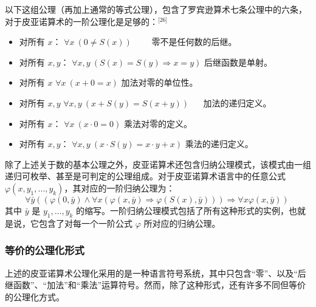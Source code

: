 以下这组公理（再加上通常的等式公理），包含了罗宾逊算术七条公理中的六条，对于皮亚诺算术的一阶公理化是足够的：\(^\text{[26]}\)
\begin{itemize}
\item 对所有 $x$：
      $\forall x\ (0 \ne S(x))$
     零不是任何数的后继。
\item 对所有 $x, y$：
      $\forall x, y\ (S(x) = S(y) \Rightarrow x = y)$
      后继函数是单射。
\item 对所有 $x$
      $\forall x\ (x + 0 = x)$
      加法对零的单位性。
\item 对所有 $x, y$
      $\forall x, y\ (x + S(y) = S(x + y))$
      加法的递归定义。
\item 对所有 $x$：
      $\forall x\ (x \cdot 0 = 0)$
      乘法对零的定义。
\item 对所有 $x, y$：
      $\forall x, y\ (x \cdot S(y) = x \cdot y + x)$
      乘法的递归定义。
\end{itemize}
除了上述关于数的基本公理之外，皮亚诺算术还包含归纳公理模式，该模式由一组递归可枚举、甚至是可判定的公理组成。对于皮亚诺算术语言中的任意公式 $\varphi(x, y_1, \ldots, y_k)$，其对应的一阶归纳公理为：
$$
\forall \bar{y} \left( \left( \varphi(0, \bar{y}) \land \forall x\left( \varphi(x, \bar{y}) \Rightarrow \varphi(S(x), \bar{y}) \right) \right) \Rightarrow \forall x \varphi(x, \bar{y}) \right)~
$$
其中 $\bar{y}$ 是 $y_1, \ldots, y_k$ 的缩写。一阶归纳公理模式包括了所有这种形式的实例，也就是说，它包含了对每一个一阶公式 $\varphi$ 所对应的归纳公理。
\subsubsection{等价的公理化形式}
上述的皮亚诺算术公理化采用的是一种语言符号系统，其中只包含“零”、以及“后继函数”、“加法”和“乘法”运算符号。然而，除了这种形式，还有许多不同但等价的公理化方式。

